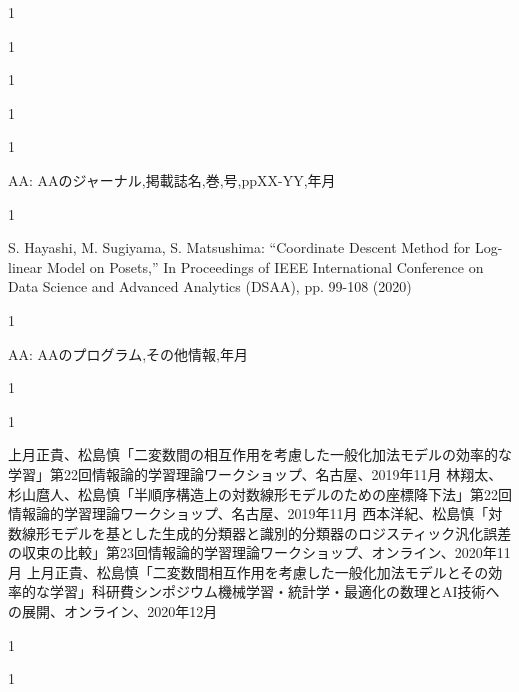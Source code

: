 \begin{招待講演}{1}

\end{招待講演}

\begin{招待論文}{1}

\end{招待論文}

\begin{受賞}{1}

\end{受賞}

\begin{著書}{1}

\end{著書}

\begin{雑誌論文}{1}

AA:
AAのジャーナル,掲載誌名,巻,号,ppXX-YY,年月
\end{雑誌論文}

\begin{査読付}{1}

S. Hayashi, M. Sugiyama, S. Matsushima: “Coordinate Descent Method for Log-linear Model on Posets,”  In Proceedings of IEEE International Conference on Data Science and Advanced Analytics (DSAA), pp. 99-108 (2020)
\end{査読付}

\begin{公開}{1}

AA:
AAのプログラム,その他情報,年月
\end{公開}

\begin{特許}{1}

\end{特許}

\begin{発表}{1}

 上月正貴、松島慎「二変数間の相互作用を考慮した一般化加法モデルの効率的な学習」第22回情報論的学習理論ワークショップ、名古屋、2019年11月
 林翔太、杉山麿人、松島慎「半順序構造上の対数線形モデルのための座標降下法」第22回情報論的学習理論ワークショップ、名古屋、2019年11月
 西本洋紀、松島慎「対数線形モデルを基とした生成的分類器と識別的分類器のロジスティック汎化誤差の収束の比較」第23回情報論的学習理論ワークショップ、オンライン、2020年11月
 上月正貴、松島慎「二変数間相互作用を考慮した一般化加法モデルとその効率的な学習」科研費シンポジウム機械学習・統計学・最適化の数理とAI技術への展開、オンライン、2020年12月
\end{発表}

\begin{特記}{1}

\end{特記}

\begin{報道}{1}

\end{報道}
